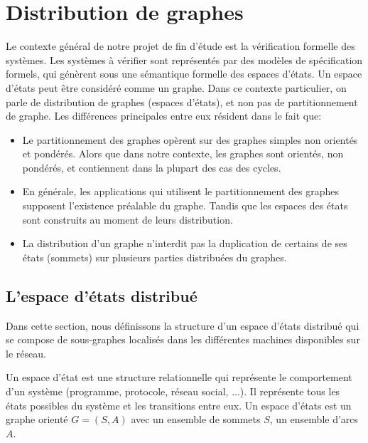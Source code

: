 
\section{Distribution de graphes}
Le contexte général de notre projet de fin d'étude est la vérification formelle des systèmes. Les systèmes à vérifier sont représentés par des modèles de spécification formels, qui génèrent sous une sémantique formelle des espaces d'états. Un espace d'états peut être considéré comme un graphe. Dans ce contexte particulier, on parle de distribution de graphes (espaces d'états), et non pas de partitionnement de graphe. Les différences principales entre eux résident dans le fait que:
\begin{itemize}
\item  Le partitionnement des graphes opèrent sur des graphes simples non orientés et pondérés. Alors que dans notre contexte, les graphes sont orientés, non pondérés, et contiennent dans la plupart des cas des cycles.
\item  En générale, les applications qui utilisent le partitionnement des graphes supposent l'existence préalable du graphe. Tandis que les espaces des états sont construits au moment de leurs distribution.
\item La distribution d'un graphe n'interdit pas la duplication de certains de ses états (sommets) sur plusieurs parties distribuées du graphes.
\end{itemize}

\subsection*{L'espace d'états distribué}{
Dans cette section, nous définissons la structure d'un espace d'états distribué qui se compose de sous-graphes localisés dans les différentes machines disponibles sur le réseau. 


Un espace d'état est une structure relationnelle qui représente le comportement d'un système (programme, protocole, réseau social, ...). Il représente tous les états possibles du système et les transitions entre eux. Un espace d'états est un graphe orienté $G = (S, A)$ avec un ensemble de sommets $S$, un ensemble d'arcs $A$.}


